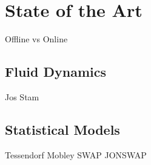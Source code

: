 \chapter{State of the Art}

Offline vs Online

\section{Fluid Dynamics}

Jos Stam

\section{Statistical Models}

Tessendorf
Mobley
SWAP
JONSWAP